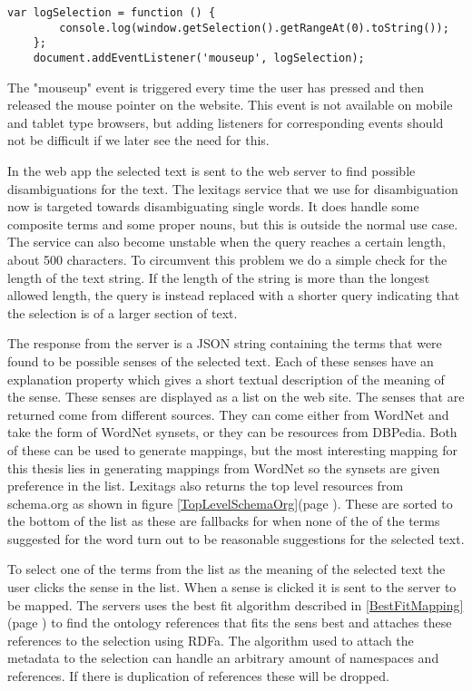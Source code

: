 \begin{lstlisting}[caption={Logging selected text}, label=DOMSelection]
	var logSelection = function () {
		console.log(window.getSelection().getRangeAt(0).toString());
	};
	document.addEventListener('mouseup', logSelection);
\end{lstlisting}

The "mouseup" event is triggered every time the user has pressed and then released the mouse pointer on the website.
This event is not available on mobile and tablet type browsers,
but adding listeners for corresponding events should not be difficult if we later see the need for this.

In the web app the selected text is sent to the web server to find possible disambiguations for the text.
The lexitags service that we use for disambiguation now is targeted towards disambiguating single words.
It does handle some composite terms and some proper nouns, but this is outside the normal use case.
The service can also become unstable when the query reaches a certain length, about 500 characters.
To circumvent this problem we do a simple check for the length of the text string.
If the length of the string is more than the longest allowed length,
the query is instead replaced with a shorter query indicating that the selection is of a larger section of text.

The response from the server is a JSON string containing the terms that were found to be possible senses of the selected text.
Each of these senses have an explanation property which gives a short textual description of the meaning of the sense.
These senses are displayed as a list on the web site.
The senses that are returned come from different sources.
They can come either from WordNet and take the form of WordNet synsets, or they can be resources from DBPedia.
Both of these can be used to generate mappings,
but the most interesting mapping for this thesis lies in generating mappings from WordNet so the synsets are given preference in the list.
Lexitags also returns the top level resources from schema.org as shown in figure \ref{TopLevelSchemaOrg}(page \pageref{TopLevelSchemaOrg}).
These are sorted to the bottom of the list as these are fallbacks for when none of the of the terms suggested for
the word turn out to be reasonable suggestions for the selected text.

To select one of the terms from the list as the meaning of the selected text the user clicks the sense in the list.
When a sense is clicked it is sent to the server to be mapped.
The servers uses the best fit algorithm described in \ref{BestFitMapping}(page \pageref{BestFitMapping}) to find the ontology references
that fits the sens best and attaches these references to the selection using RDFa.
The algorithm used to attach the metadata to the selection can handle an arbitrary amount of namespaces and references.
If there is duplication of references these will be dropped.

